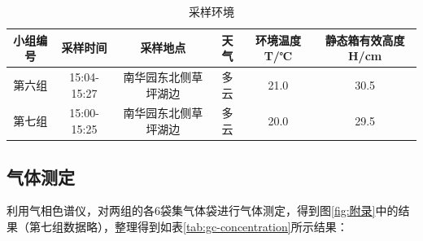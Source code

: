 \documentclass[10.5pt]{config}
\begin{document}
\vspace{2em}

\begin{table}[h]
    \centering
    \caption{采样环境}
    \label{tab:sampling-environment}
    
    \begin{tabular}{cccccc} 
        \toprule
        小组编号 &  采样时间 & 采样地点 & 天气 & 环境温度T/℃ &  静态箱有效高度H/cm \\
        \midrule
        
        第六组 & 
        15:04-15:27 & 
        南华园东北侧草坪湖边& 
        多云 & 21.0 & 30.5 \\
        
        第七组 & 
        15:00-15:25 & 
        南华园东北侧草坪湖边& 
        多云 & 20.0 & 29.5 \\
        
        \bottomrule
    \end{tabular}
\end{table}


\newpage

\subsection{气体测定}

利用气相色谱仪，对两组的各6袋集气体袋进行气体测定，得到图\ref{fig:附录}中的结果（第七组数据略），整理得到如表\ref{tab:gc-concentration}所示结果：
\end{document}
